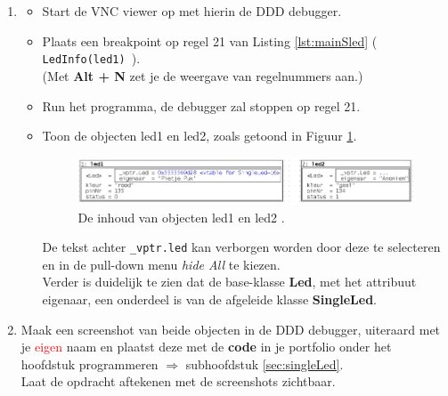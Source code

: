 \begin{enumerate}[label=(\alph*)]
De uitkomst van het programma is als volgt:\\
\texttt{De eigenaar is:Pietje Puk\\
De Led is aangesloten op pinnen135\\
De status van de Led is:0\\
De eigenaar is:Anoniem\\
De Led is aangesloten op pinnen134\\
De status van de Led is:1\\
De eigenaar is:Pietje Puk\\
De Led is aangesloten op pinnen135\\
De status van de Led is:0\\}
\item 
\begin{itemize}
	\item Start de VNC viewer op met hierin de DDD debugger.
	\item Plaats een breakpoint op regel 21 van Listing \ref{lst:mainSled} ({\small \texttt{ LedInfo(led1) }}). \\ (Met \textbf{Alt + N} zet je de weergave van regelnummers aan.)
	\item Run het programma, de debugger zal stoppen op regel 21.
	\item Toon de objecten led1 en led2, zoals getoond in Figuur \ref{fig:DDDLed1_2}. 
	\begin{figure}[h!]
		\captionsetup{justification=centering}
    	\includegraphics[width=0.95 \textwidth]{figuren/DDDLed1Led2}
		\centering
		\caption{De inhoud van objecten led1 en led2 .}
		\label{fig:DDDLed1_2}
	\end{figure}
	De tekst achter \texttt{\_vptr.led} kan verborgen worden door deze te selecteren en in de pull-down menu \textit{hide All} te kiezen. \\
	Verder is duidelijk te zien dat de base-klasse  \textbf{Led}, met het attribuut eigenaar, een onderdeel is van de afgeleide klasse \textbf{SingleLed}.
\end{itemize}

\item Maak een screenshot van beide objecten in de DDD debugger, uiteraard met je \textcolor{red}{\huge{eigen}} naam en plaatst deze met de \textbf{code} in je portfolio onder het hoofdstuk programmeren $\Longrightarrow$ subhoofdstuk \ref{sec:singleLed}. \\ 
Laat de opdracht aftekenen met de screenshots zichtbaar.

\end{enumerate}
\newpage
